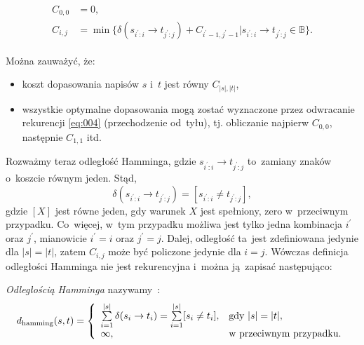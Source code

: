 \documentclass{praca1}
\begin{document}
\begin{align}
\begin{split}
\label{eq:004}
C_{0,0} &= 0, \\
C_{i,j} &= \min\{\delta(s_{i^\prime:i}\rightarrow t_{j^\prime:j}) + C_{i^\prime-1, j^\prime-1} | s_{i^\prime:i}\rightarrow t_{j^\prime:j} \in \mathbb{B}\}.
\end{split}
\end{align}

Można zauważyć, że:
\begin{itemize}
\item koszt dopasowania napisów $s$ i~$t$ jest równy $C_{|s|, |t|}$,
\item wszystkie optymalne dopasowania mogą zostać wyznaczone przez odwracanie rekurencji \eqref{eq:004} (przechodzenie od~tyłu), tj. obliczanie najpierw $C_{0,0}$, następnie $C_{1,1}$ itd.
\end{itemize}




Rozważmy teraz odległość Hamminga, gdzie $s_{i^\prime:i}\rightarrow t_{j^\prime:j}$ to~zamiany znaków o~koszcie równym jeden. Stąd,
\begin{equation}
\label{eq:005}
\delta(s_{i^\prime:i}\rightarrow t_{j^\prime:j}) = [s_{i^\prime:i}\neq t_{j^\prime:j}],
\end{equation}
gdzie $[X]$ jest równe jeden, gdy warunek $X$ jest spełniony, zero w~przeciwnym przypadku. Co~więcej, w~tym przypadku możliwa jest tylko jedna kombinacja $i^\prime$ oraz $j^\prime$, mianowicie $i^\prime = i$ oraz $j^\prime = j$. Dalej, odległość ta~jest zdefiniowana jedynie dla $|s| = |t|$, zatem $C_{i,j}$ może być policzone jedynie dla $i = j$. Wówczas definicja odległości Hamminga nie jest rekurencyjna i~można ją~zapisać następująco:


\begin{definition}
\emph{Odległością Hamminga} nazywamy~\cite{Hamming1950:errordetecting}:
$$
d_{\mathrm{hamming}}(s, t) = \left\{
\begin{array}{l l}     
    \sum\limits_{i=1}^{|s|}\delta(s_i \rightarrow t_i) = \sum\limits_{i=1}^{|s|}[s_i\neq t_i], & \text{gdy } |s| = |t|,\\
    \infty, & \text{w przeciwnym przypadku}.
\end{array}\right.
$$
\end{definition}
\end{document}
